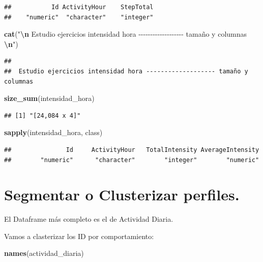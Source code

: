 \documentclass[
]{article}
\newenvironment{Shaded}{\begin{snugshade}}{\end{snugshade}}
\newcommand{\FunctionTok}[1]{\textcolor[rgb]{0.13,0.29,0.53}{\textbf{#1}}}
\newcommand{\NormalTok}[1]{#1}
\newcommand{\SpecialCharTok}[1]{\textcolor[rgb]{0.81,0.36,0.00}{\textbf{#1}}}
\newcommand{\StringTok}[1]{\textcolor[rgb]{0.31,0.60,0.02}{#1}}
\begin{document}
\begin{verbatim}
##           Id ActivityHour    StepTotal 
##    "numeric"  "character"    "integer"
\end{verbatim}

\begin{Shaded}
\begin{Highlighting}[]
\FunctionTok{cat}\NormalTok{(}\StringTok{"}\SpecialCharTok{\textbackslash{}n}\StringTok{ Estudio ejercicios intensidad hora {-}{-}{-}{-}{-}{-}{-}{-}{-}{-}{-}{-}{-}{-}{-}{-}{-}{-}{-} tamaño y columnas }\SpecialCharTok{\textbackslash{}n}\StringTok{"}\NormalTok{)}
\end{Highlighting}
\end{Shaded}

\begin{verbatim}
## 
##  Estudio ejercicios intensidad hora ------------------- tamaño y columnas
\end{verbatim}

\begin{Shaded}
\begin{Highlighting}[]
\FunctionTok{size\_sum}\NormalTok{(intensidad\_hora)}
\end{Highlighting}
\end{Shaded}

\begin{verbatim}
## [1] "[24,084 x 4]"
\end{verbatim}

\begin{Shaded}
\begin{Highlighting}[]
\FunctionTok{sapply}\NormalTok{(intensidad\_hora, class)}
\end{Highlighting}
\end{Shaded}

\begin{verbatim}
##               Id     ActivityHour   TotalIntensity AverageIntensity 
##        "numeric"      "character"        "integer"        "numeric"
\end{verbatim}

\section{Segmentar o Clusterizar
perfiles.}\label{segmentar-o-clusterizar-perfiles.}

El Dataframe más completo es el de Actividad Diaria.

Vamos a clasterizar los ID por comportamiento:

\begin{Shaded}
\begin{Highlighting}[]
\FunctionTok{names}\NormalTok{(actividad\_diaria)}
\end{Highlighting}
\end{Shaded}
\end{document}
